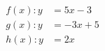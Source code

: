 \documentclass[preview]{standalone}
\begin{document}
\begin{align*}
f(x):y&=5x -3 \\ g(x):y&=-3x+5 \\ h(x): y&= 2x
\end{align*}
\end{document}
